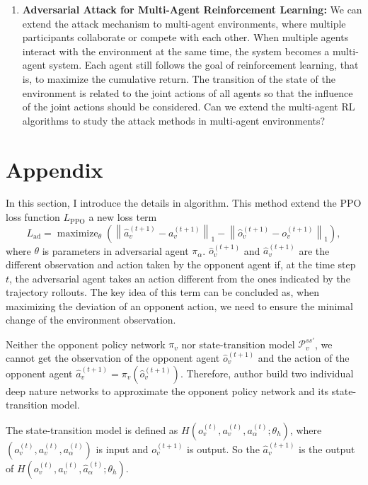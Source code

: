 \documentclass[a4paper]{article}
\begin{document}
\begin{enumerate}
    \item \textbf{Adversarial Attack for Multi-Agent Reinforcement Learning: }
    We can extend the attack mechanism to multi-agent environments, where multiple participants collaborate or compete with each other. When multiple agents interact with the environment at the same time, the system becomes a multi-agent system. Each agent still follows the goal of reinforcement learning, that is, to maximize the cumulative return. The transition of the state of the environment is related to the joint actions of all agents so that the influence of the joint actions should be considered. Can we extend the multi-agent RL algorithms to study the attack methods in multi-agent environments?
\end{enumerate}

\clearpage



\section*{Appendix}
In this section, I introduce the details in algorithm. This method extend the PPO loss function $L_\text{PPO}$ a new loss term
\begin{equation}
    L_\text{ad}=\operatorname{maximize}_{\theta}\left(\left\|\hat{a}_{v}^{(t+1)}-a_{v}^{(t+1)}\right\|_{1}-\left\|\hat{o}_{v}^{(t+1)}-o_{v}^{(t+1)}\right\|_{1}\right),
\end{equation}
where $\theta$ is parameters in adversarial agent $\pi_\alpha$.
$\hat{o}_v^{(t+1)}$ and $\hat{a}_v^{(t+1)}$ are the different observation and action taken by the opponent agent if, 
at the time step $t$, the adversarial agent takes an action different from the ones indicated by the trajectory rollouts.
The key idea of this term can be concluded as, 
when maximizing the deviation of an opponent action,
we need to ensure the minimal change of the environment observation. 

Neither the opponent policy network $\pi_v$ nor state-transition model $\mathcal{P}_v^{ss'}$,
we cannot get the observation of the opponent agent $\hat{o}_v^{(t+1)}$ and the action of the opponent agent $\hat{a}_v^{(t+1)} = \pi_v(\hat{o}_v^{(t+1)})$.
Therefore, author build two individual deep nature networks to approximate the opponent policy network and its state-transition model.

The state-transition model is defined as $H(o_v^{(t)},a_v^{(t)},a_\alpha^{(t)}; \theta_h)$, where $(o_v^{(t)},a_v^{(t)},a_\alpha^{(t)})$ is input and $o_v^{(t+1)}$ is output.
So the $\hat{a}_{v}^{(t+1)}$ is the output of $H(o_v^{(t)},a_v^{(t)},\hat{a}_\alpha^{(t)}; \theta_h)$.
\end{document}
